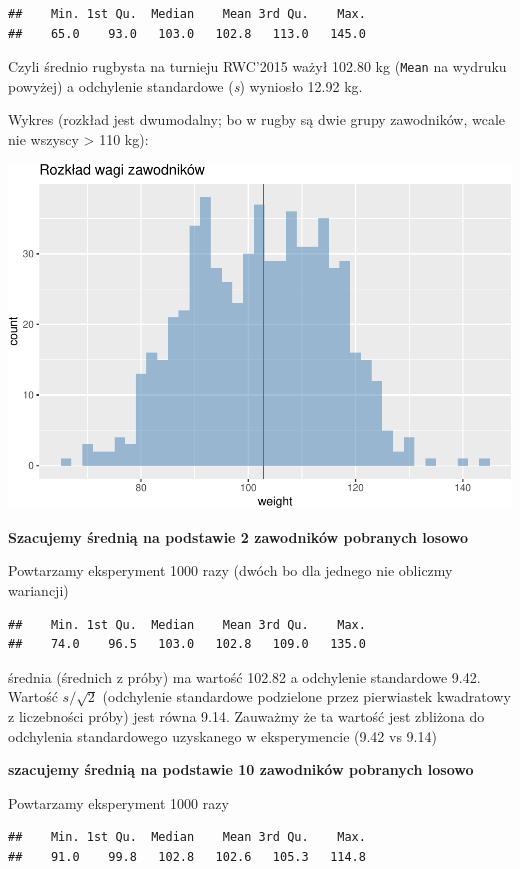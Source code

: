 \documentclass[
  openany]{book}
\begin{document}
\begin{verbatim}
##    Min. 1st Qu.  Median    Mean 3rd Qu.    Max. 
##    65.0    93.0   103.0   102.8   113.0   145.0
\end{verbatim}

Czyli średnio rugbysta na turnieju RWC'2015 ważył
102.80 kg (\texttt{Mean} na wydruku powyżej)
a odchylenie standardowe (\emph{s}) wyniosło 12.92 kg.

Wykres (rozkład jest dwumodalny; bo w rugby są dwie grupy zawodników, wcale
nie wszyscy \textgreater{} 110 kg):

\includegraphics{_main_files/figure-latex/unnamed-chunk-22-1.pdf}

\textbf{Szacujemy średnią na podstawie 2 zawodników pobranych losowo}

Powtarzamy eksperyment 1000 razy (dwóch bo dla jednego nie obliczmy
wariancji)

\begin{verbatim}
##    Min. 1st Qu.  Median    Mean 3rd Qu.    Max. 
##    74.0    96.5   103.0   102.8   109.0   135.0
\end{verbatim}

średnia (średnich z próby) ma wartość 102.82
a odchylenie standardowe 9.42.
Wartość \(s/\sqrt{2}\) (odchylenie standardowe podzielone przez pierwiastek kwadratowy
z liczebności próby) jest równa 9.14. Zauważmy że ta wartość
jest zbliżona do odchylenia standardowego uzyskanego
w eksperymencie (9.42 vs 9.14)

\textbf{szacujemy średnią na podstawie 10 zawodników pobranych losowo}

Powtarzamy eksperyment 1000 razy

\begin{verbatim}
##    Min. 1st Qu.  Median    Mean 3rd Qu.    Max. 
##    91.0    99.8   102.8   102.6   105.3   114.8
\end{verbatim}
\end{document}
